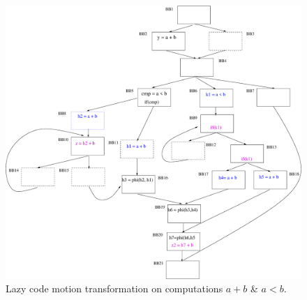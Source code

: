 \begin{figure}[htbp]
  \begin{center}
     \includegraphics[scale=0.3]{Figs/2} 
  \end{center}
  \caption{Lazy code motion transformation on computations $a + b$ \& $a < b$.}
  \label{fig:2} 
\end{figure}
